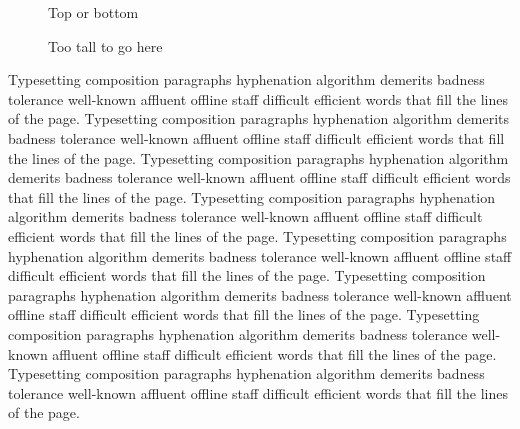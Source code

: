 \documentclass{article}
\begin{document}
\begin{figure}[tb]
\vspace{80pt}
\caption{Top or bottom}
\end{figure}

\begin{figure}[h]
\vspace{300pt}
\caption{Too tall to go here}
\end{figure}

Typesetting composition paragraphs hyphenation algorithm demerits badness tolerance well-known affluent offline staff difficult efficient words that fill the lines of the page. Typesetting composition paragraphs hyphenation algorithm demerits badness tolerance well-known affluent offline staff difficult efficient words that fill the lines of the page. Typesetting composition paragraphs hyphenation algorithm demerits badness tolerance well-known affluent offline staff difficult efficient words that fill the lines of the page. Typesetting composition paragraphs hyphenation algorithm demerits badness tolerance well-known affluent offline staff difficult efficient words that fill the lines of the page. Typesetting composition paragraphs hyphenation algorithm demerits badness tolerance well-known affluent offline staff difficult efficient words that fill the lines of the page. Typesetting composition paragraphs hyphenation algorithm demerits badness tolerance well-known affluent offline staff difficult efficient words that fill the lines of the page. Typesetting composition paragraphs hyphenation algorithm demerits badness tolerance well-known affluent offline staff difficult efficient words that fill the lines of the page. Typesetting composition paragraphs hyphenation algorithm demerits badness tolerance well-known affluent offline staff difficult efficient words that fill the lines of the page.
\end{document}
